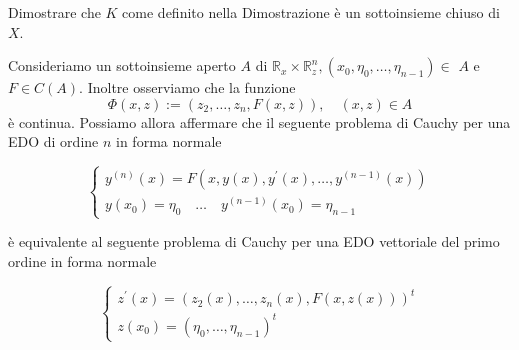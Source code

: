 \begin{exc}
    Dimostrare che $K$ come definito nella Dimostrazione è un sottoinsieme chiuso di $X$.
\end{exc}
\begin{oss}
    Consideriamo un sottoinsieme aperto $A$ di $\mathbb{R}_{x} \times \mathbb{R}_{z}^{n},\left(x_{0}, \eta_{0}, \ldots, \eta_{n-1}\right) \in$ $A$ e $F \in C(A)$. Inoltre osserviamo che la funzione
    \[\Phi(x, z):=\left(z_{2}, \ldots, z_{n}, F(x, z)\right), \quad(x, z) \in A\]
    è continua. Possiamo allora affermare che il seguente problema di Cauchy per una EDO di ordine $n$ in forma normale

    \begin{equation}\label{eq: 5.1.1}
        \begin{cases}
        y^{(n)}(x)=F\left(x, y(x), y^{\prime}(x), \ldots, y^{(n-1)}(x)\right)\\
        y\left(x_{0}\right)=\eta_{0}\quad \ldots\quad  y^{(n-1)}\left(x_{0}\right)=\eta_{n-1}
        \end{cases}
    \end{equation}

    è equivalente al seguente problema di Cauchy per una EDO vettoriale del primo ordine in forma normale

    \begin{equation}\label{eq: 5.1.2}
    \begin{cases}
    z^{\prime}(x)=\left(z_{2}(x), \ldots, z_{n}(x), F(x, z(x))\right)^{t}\\
    z\left(x_{0}\right)=\left(\eta_{0}, \ldots, \eta_{n-1}\right)^{t}
    \end{cases}
    \end{equation}


\end{oss}
